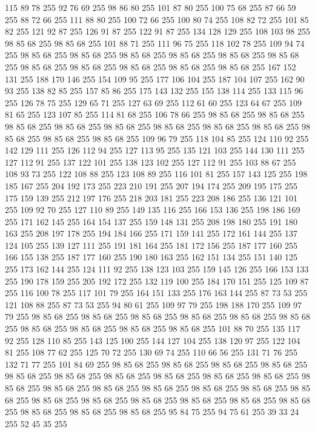 115 89 78 255 92 76 69 255 98 86 80 255 101 87 80 255 100 75 68 255 87 66 59 255 88 72 66 255 111 88 80 255 100 72 66 255 100 80 74 255 108 82 72 255 101 85 82 255 121 92 87 255 126 91 87 255 122 91 87 255 134 128 129 255 108 103 98 255 98 85 68 255 98 85 68 255 101 88 71 255 111 96 75 255 118 102 78 255 109 94 74 255 98 85 68 255 98 85 68 255 98 85 68 255 98 85 68 255 98 85 68 255 98 85 68 255 98 85 68 255 98 85 68 255 98 85 68 255 98 85 68 255 98 85 68 255 167 152 131 255 188 170 146 255 154 109 95 255 177 106 104 255 187 104 107 255 162 90 93 255 138 82 85 255 157 85 86 255 175 143 132 255 155 138 114 255 133 115 96 255 126 78 75 255 129 65 71 255 127 63 69 255 112 61 60 255 123 64 67 255 109 81 65 255 123 107 85 255 114 81 68 255 106 78 66 255 98 85 68 255 98 85 68 255 98 85 68 255 98 85 68 255 98 85 68 255 98 85 68 255 98 85 68 255 98 85 68 255 98 85 68 255 98 85 68 255
98 85 68 255 109 96 79 255 118 104 85 255 124 110 92 255 142 129 111 255 126 112 94 255 127 113 95 255 135 121 103 255 144 130 111 255 127 112 91 255 137 122 101 255 138 123 102 255 127 112 91 255 103 88 67 255 108 93 73 255 122 108 88 255 123 108 89 255 116 101 81 255 157 143 125 255 198 185 167 255 204 192 173 255 223 210 191 255 207 194 174 255 209 195 175 255 175 159 139 255 212 197 176 255 218 203 181 255 223 208 186 255 136 121 101 255 109 92 70 255 127 110 89 255 149 135 116 255 166 153 136 255 198 186 169 255 171 162 145 255 164 154 137 255 159 148 131 255 208 198 180 255 191 180 163 255 208 197 178 255 194 184 166 255 171 159 141 255 172 161 144 255 137 124 105 255 139 127 111 255 191 181 164 255 181 172 156 255 187 177 160 255 166 155 138 255 187 177 160 255 190 180 163 255 162 151 134 255 151 140 125 255 173 162 144 255 124 111 92 255 138 123 103 255 159 145 126 255 166 153 133 255 190 178 159 255 205 192 172 255 132 119 100 255 184 170 151 255 125 109 87 255 116 100 78 255
117 101 79 255 164 151 133 255 176 163 144 255 87 73 53 255 121 108 88 255 87 73 53 255 94 80 61 255 109 97 79 255 198 188 170 255 109 97 79 255 98 85 68 255 98 85 68 255 98 85 68 255 98 85 68 255 98 85 68 255 98 85 68 255 98 85 68 255 98 85 68 255 98 85 68 255 98 85 68 255 101 88 70 255 135 117 92 255 128 110 85 255 143 125 100 255 144 127 104 255 138 120 97 255 122 104 81 255 108 77 62 255 125 70 72 255 130 69 74 255 110 66 56 255 131 71 76 255 132 71 77 255 101 84 69 255 98 85 68 255 98 85 68 255 98 85 68 255 98 85 68 255 98 85 68 255 98 85 68 255 98 85 68 255 98 85 68 255 98 85 68 255 98 85 68 255 98 85 68 255 98 85 68 255 98 85 68 255 98 85 68 255 98 85 68 255 98 85 68 255 98 85 68 255 98 85 68 255 98 85 68 255 98 85 68 255 98 85 68 255 98 85 68 255 98 85 68 255 98 85 68 255 98 85 68 255 98 85 68 255 95 84 75 255 94 75 61 255 39 33 24 255 52 45 35 255
